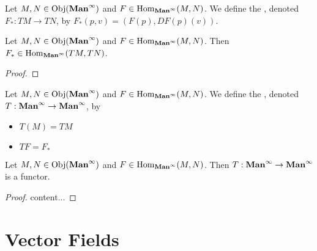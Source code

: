 \documentclass{book}
\begin{document}
\begin{defn}
	Let $M,N \in \Obj(\Maninf)$ and $F \in \Hom_{\Maninf}(M,N)$. We define the , denoted $F_*:TM \rightarrow TN$, by $F_*(p, v) = (F(p), DF(p)(v))$. 
\end{defn}

\begin{ex}
	Let $M,N \in \Obj(\Maninf)$ and $F \in \Hom_{\Maninf}(M,N)$. Then $F_* \in \Hom_{\Maninf}(TM, TN)$.
\end{ex}

\begin{proof}
	
\end{proof}

\begin{defn}
	Let $M,N \in \Obj(\Maninf)$ and $F \in \Hom_{\Maninf}(M,N)$. We define the , denoted $T: \Maninf \rightarrow \Maninf$, by 
	\begin{itemize}
		\item $T(M) = TM$
		\item $TF = F_*$ 
	\end{itemize}
\end{defn}

\begin{ex}
	Let $M,N \in \Obj(\Maninf)$ and $F \in \Hom_{\Maninf}(M,N)$. Then $T: \Maninf \rightarrow \Maninf$ is a functor.
\end{ex}

\begin{proof}
	content...
\end{proof}

















\section{Vector Fields}


\begin{ex}
	
\end{ex}
\end{document}
